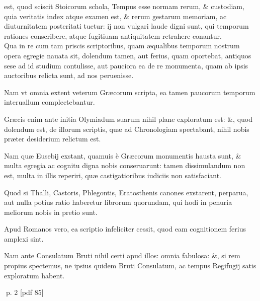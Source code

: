 \setcounter{parcount}{0}
\begin{parnumbers}
est, quod sciscit Stoicorum schola, Tempus esse normam rerum, \& custodiam, quia veritatis index atque examen est, \& rerum gestarum memoriam, ac diuturnitatem posteritati tuetur: ij non vulgari laude digni sunt, qui temporum rationes conscribere, atque fugitiuam antiquitatem retrahere conantur.
\\ \p
Qua in re cum tam priscis scriptoribus, quam æqualibus temporum nostrum opera egregie nauata sit, dolendum tamen, aut
ferius, quam oportebat, antiquos sese ad id studium contulisse, aut pauciora ea de re monumenta, quam ab ipsis
auctoribus relicta sunt, ad nos peruenisse.

Nam vt omnia extent veterum Græcorum scripta, ea tamen paucorum temporum interuallum complectebantur.

Græcis enim ante initia Olymiadum suarum nihil plane exploratum est: \&, quod dolendum est, de illorum scriptis, quæ ad Chronologiam spectabant, nihil nobis præter desiderium relictum est.

Nam quæ Eusebij exstant, quamuis è Græcorum monumentis hausta sunt, \& multa egregia ac cognitu digna nobis conseruarunt: tamen dissimulandum non est, multa in illis reperiri, quæ castigatioribus iudiciis non satisfaciant.

Quod si Thalli, Castoris, Phlegontis, Eratosthenis canones exstarent, perparua, aut nulla potius ratio haberetur librorum quorundam, qui hodi in penuria meliorum nobis in pretio sunt.

Apud Romanos vero, ea scriptio infeliciter cessit, quod eam cognitionem ferius amplexi sint.

Nam ante Consulatum Bruti nihil certi apud illos: omnia fabulosa: \&, si rem propius spectemus, ne ipsius quidem Bruti Consulatum, ac tempus Regifugij satis exploratum habent.

\end{parnumbers}
\clearpage
p. 2 [pdf 85]

